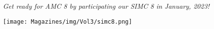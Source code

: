 \documentclass{article}
\date{\hspace{30mm}}
\begin{document}
\maketitle
\begin{minipage}[t]{.45\textwidth}\thispagestyle{empty}
  \vspace{-11mm}
  \tableofcontents
\end{minipage}%
\begin{minipage}[t]{.1\textwidth}\thispagestyle{empty}
  \;
\end{minipage}%
\begin{minipage}[t]{.45\textwidth}\thispagestyle{empty}
  \footnotesize
  \setlength{\parskip}{5pt}
  \vspace{-7mm}
  {\itshape
  Get ready for AMC 8 by participating our SIMC 8 in January, 2023!
    \begin{center}
        \texttt{[image: Magazines/img/Vol3/simc8.png]}
    \end{center}
}
\end{minipage}

\vspace{3mm}
\end{document}
